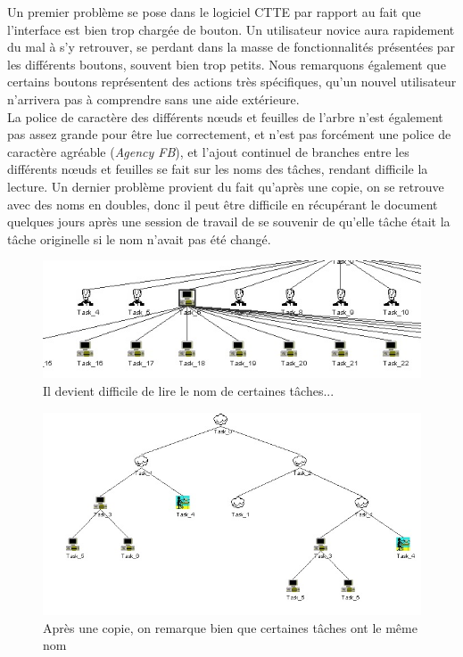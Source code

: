 \documentclass[12pt, a4paper]{article}
\begin{document}
Un premier problème se pose dans le logiciel CTTE par rapport au fait que l'interface est bien trop chargée de bouton. Un utilisateur novice aura rapidement du mal à s'y retrouver, se perdant dans la masse de fonctionnalités présentées par les différents boutons, souvent bien trop petits. Nous remarquons également que certains boutons représentent des actions très spécifiques, qu'un nouvel utilisateur n'arrivera pas à comprendre sans une aide extérieure.\\ 
La police de caractère des différents nœuds et feuilles de l'arbre n'est également pas assez grande pour être lue correctement, et n'est pas forcément une police de caractère agréable (\emph{Agency FB}), et l'ajout continuel de branches entre les différents nœuds et feuilles se fait sur les noms des tâches, rendant difficile la lecture. Un dernier problème provient du fait qu'après une copie, on se retrouve avec des noms en doubles, donc il peut être difficile en récupérant le document quelques jours après une session de travail de se souvenir de qu'elle tâche était la tâche originelle si le nom n'avait pas été changé. 
\begin{figure}[h]
\begin{center}
   \includegraphics[scale = 0.5]{empilement.jpg}
	\caption{Il devient difficile de lire le nom de certaines tâches...}
	\end{center}
\end{figure}

\begin{figure}[h]
\begin{center}
   \includegraphics[scale = 0.5]{copierate.jpg}
	\caption{Après une copie, on remarque bien que certaines tâches ont le même nom}
	\end{center}
\end{figure}
\newpage
\end{document}
